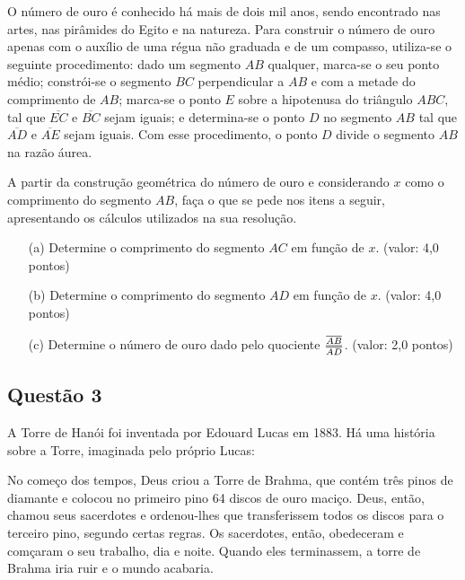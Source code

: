 \documentclass{report}
\begin{document}
O n\'umero de ouro \'e conhecido h\'a mais de dois mil anos, sendo encontrado nas artes, nas pir\^amides do Egito e na natureza. Para construir o n\'umero de ouro apenas com o aux\'ilio de uma r\'egua n\~ao graduada e de um compasso, utiliza-se o seguinte procedimento: dado um segmento $AB$ qualquer, marca-se o seu ponto m\'edio; constr\'oi-se o segmento $BC$ perpendicular a $AB$ e com a metade do comprimento de $AB$; marca-se o ponto $E$ sobre a hipotenusa do tri\^angulo $ABC$, tal que $\overline{EC}$ e $\overline{BC}$ sejam iguais; e determina-se o ponto $D$ no segmento $AB$ tal que $\overline{AD}$ e $\overline{AE}$ sejam iguais. Com esse procedimento, o ponto $D$ divide o segmento $AB$ na raz\~ao \'aurea.

A partir da constru\c c\~ao geom\'etrica do n\'umero de ouro e considerando $x$ como o comprimento do segmento $AB$, fa\c ca o que se pede nos itens a seguir, apresentando os c\'alculos utilizados na sua resolu\c c\~ao.

\begin{enumerate}

\item[(a)] Determine o comprimento do segmento $AC$ em fun\c c\~ao de $x$. (valor: 4,0 pontos)

\item[(b)] Determine o comprimento do segmento $AD$ em fun\c c\~ao de $x$. (valor: 4,0 pontos)

\item[(c)] Determine o n\'umero de ouro dado pelo quociente $\overline{AB}\over\overline{AD}$. (valor: 2,0 pontos)
\end{enumerate}

\subsection{\color{blue} Quest\~ao 3}

A Torre de Han\'oi foi inventada por Edouard Lucas em 1883. H\'a uma hist\'oria sobre a Torre, imaginada pelo pr\'oprio Lucas:

No come\c co dos tempos, Deus criou a Torre de Brahma, que cont\'em tr\^es pinos de diamante e colocou no primeiro pino 64 discos de ouro maci\c co. Deus, ent\~ao, chamou seus sacerdotes e ordenou-lhes que transferissem todos os discos para o terceiro pino, segundo certas regras. Os sacerdotes, ent\~ao, obedeceram e com\c caram o seu trabalho, dia e noite. Quando eles terminassem, a torre de Brahma iria ruir e o mundo acabaria.
\end{document}
